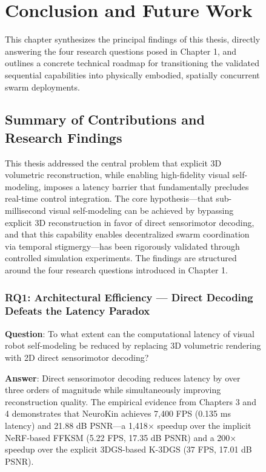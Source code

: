 \documentclass[12pt,a4paper,oneside]{report}
\begin{document}
\begin{figure}[H]
\chapter{Conclusion and Future Work}
\label{chap:conclusion_future_work_ch8}

This chapter synthesizes the principal findings of this thesis, directly answering the four research questions posed in Chapter 1, and outlines a concrete technical roadmap for transitioning the validated sequential capabilities into physically embodied, spatially concurrent swarm deployments.

\section{Summary of Contributions and Research Findings}

This thesis addressed the central problem that explicit 3D volumetric reconstruction, while enabling high-fidelity visual self-modeling, imposes a latency barrier that fundamentally precludes real-time control integration. The core hypothesis---that sub-millisecond visual self-modeling can be achieved by bypassing explicit 3D reconstruction in favor of direct sensorimotor decoding, and that this capability enables decentralized swarm coordination via temporal stigmergy---has been rigorously validated through controlled simulation experiments. The findings are structured around the four research questions introduced in Chapter 1.

\subsection{RQ1: Architectural Efficiency --- Direct Decoding Defeats the Latency Paradox}

\textbf{Question}: To what extent can the computational latency of visual robot self-modeling be reduced by replacing 3D volumetric rendering with 2D direct sensorimotor decoding?

\textbf{Answer}: Direct sensorimotor decoding reduces latency by over three orders of magnitude while simultaneously improving reconstruction quality. The empirical evidence from Chapters 3 and 4 demonstrates that NeuroKin achieves 7,400 FPS (0.135 ms latency) and 21.88 dB PSNR---a 1,418$\times$ speedup over the implicit NeRF-based FFKSM (5.22 FPS, 17.35 dB PSNR) and a 200$\times$ speedup over the explicit 3DGS-based K-3DGS (37 FPS, 17.01 dB PSNR).


\end{figure}
\end{document}
